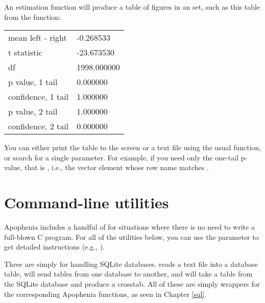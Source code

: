 An estimation function will produce a table of figures in an
 set, such as this table from the 
function:

\begin{center}
\begin{tabular}{|ll|}
\hline
mean left - right     &-0.268533\\
t statistic           &-23.673530\\
df                    & 1998.000000\\
p value, 1 tail       & 0.000000\\
confidence, 1 tail    & 1.000000\\
p value, 2 tail       & 1.000000\\
confidence, 2 tail    & 0.000000\\
\hline
\end{tabular}
\end{center}
\hspace\baselineskip

You can either print the table to the screen or a text file using the
usual  function, or search for a single
parameter. For example, if you need only the one-tail p-value, that is
, i.e., the vector
element whose row name matches .


\section{Command-line utilities}
Apophenia includes a handful of  for
situations where there is no need to write a full-blown C program. For
all of the utilities below, you can use the  parameter to
get detailed instructions (e.g., ).

Three are simply for handling SQLite databases.  
 reads a text file into a database table,
 will send tables from one database to
another, and
 will take a table from the SQLite
database and produce a crosstab. All of these are simply wrappers for
the corresponding Apophenia functions, as seen in Chapter \ref{sql}.

